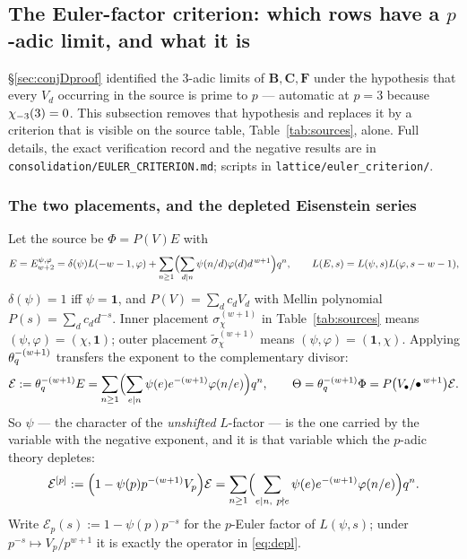 \subsection{The Euler-factor criterion: which rows have a $p$-adic limit, and
what it is}\label{sec:eulercrit}

\S\ref{sec:conjDproof} identified the $3$-adic limits of $\mathbf B,\mathbf C,
\mathbf F$ under the hypothesis that every $V_d$ occurring in the source is
prime to $p$ --- automatic at $p=3$ because $\chi_{-3}(3)=0$.  This subsection
removes that hypothesis and replaces it by a criterion that is visible on the
source table, Table~\ref{tab:sources}, alone.  Full details, the exact
verification record and the negative results are in
\texttt{consolidation/EULER\_CRITERION.md}; scripts in
\texttt{lattice/euler\_criterion/}.

\subsubsection*{The two placements, and the depleted Eisenstein series}

Let the source be $\Phi=P(V)E$ with
\begin{equation}\label{eq:Epsiphi}
E=E^{\psi,\varphi}_{w+2}
=\delta(\psi)L(-w-1,\varphi)+\sum_{n\ge1}\Bigl(\sum_{d\mid n}\psi(n/d)\varphi(d)d^{\,w+1}\Bigr)q^n,
\qquad L(E,s)=L(\psi,s)L(\varphi,s-w-1),
\end{equation}
$\delta(\psi)=1$ iff $\psi=\mathbf 1$, and $P(V)=\sum_dc_dV_d$ with Mellin
polynomial $P(s)=\sum_dc_dd^{-s}$.  Inner placement
$\sigma^{(w+1)}_\chi$ in Table~\ref{tab:sources} means $(\psi,\varphi)=(\chi,\mathbf 1)$;
outer placement $\widetilde\sigma^{(w+1)}_\chi$ means $(\psi,\varphi)=(\mathbf 1,\chi)$.
Applying $\theta_q^{-(w+1)}$ transfers the exponent to the complementary divisor:
\begin{equation}\label{eq:Ecal}
\mathcal E:=\theta_q^{-(w+1)}E=\sum_{n\ge1}\Bigl(\sum_{e\mid n}\psi(e)e^{-(w+1)}\varphi(n/e)\Bigr)q^n ,
\qquad \Theta=\theta_q^{-(w+1)}\Phi=P\bigl(V_\bullet/\bullet^{\,w+1}\bigr)\mathcal E .
\end{equation}
So $\psi$ --- the character of the \emph{unshifted} $L$-factor --- is the one
carried by the variable with the negative exponent, and it is that variable
which the $p$-adic theory depletes:
\begin{equation}\label{eq:depl}
\mathcal E^{[p]}:=\Bigl(1-\psi(p)p^{-(w+1)}V_p\Bigr)\mathcal E
=\sum_{n\ge1}\Bigl(\sum_{e\mid n,\ p\nmid e}\psi(e)e^{-(w+1)}\varphi(n/e)\Bigr)q^n .
\end{equation}
Write $\mathcal E_p(s):=1-\psi(p)p^{-s}$ for the $p$-Euler factor of $L(\psi,s)$;
under $p^{-s}\mapsto V_p/p^{w+1}$ it is exactly the operator in \eqref{eq:depl}.

